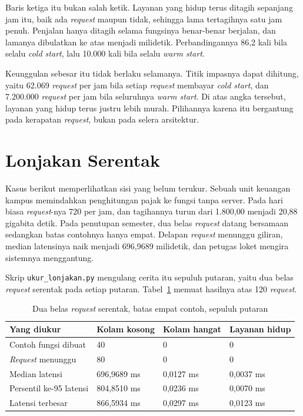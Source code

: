 Baris ketiga itu bukan salah ketik. Layanan yang hidup terus ditagih sepanjang
jam itu, baik ada \textit{request} maupun tidak, sehingga lama tertagihnya satu jam
penuh. Penjalan hanya ditagih selama fungsinya benar-benar berjalan, dan
lamanya dibulatkan ke atas menjadi milidetik. Perbandingannya 86,2 kali bila
selalu \textit{cold start}, lalu 10.000 kali bila selalu \textit{warm
start}.

Keunggulan sebesar itu tidak berlaku selamanya. Titik impasnya dapat dihitung,
yaitu 62.069 \textit{request} per jam bila setiap \textit{request} membayar
\textit{cold start}, dan 7.200.000 \textit{request} per jam bila seluruhnya
\textit{warm start}. Di atas angka
tersebut, layanan yang hidup terus justru lebih murah. Pilihannya karena itu
bergantung pada kerapatan \textit{request}, bukan pada selera arsitektur.

\section{Lonjakan Serentak}

Kasus berikut memperlihatkan sisi yang belum terukur. Sebuah unit keuangan
kampus memindahkan penghitungan pajak ke fungsi tanpa server. Pada hari biasa
\textit{request}-nya 720 per jam, dan tagihannya turun dari 1.800,00 menjadi 20,88
gigabita detik. Pada penutupan semester, dua belas \textit{request} datang bersamaan
sedangkan batas contohnya hanya empat. Delapan \textit{request} menunggu giliran,
median latensinya naik menjadi 696,9689 milidetik, dan petugas loket mengira
sistemnya menggantung.

Skrip \texttt{ukur\_lonjakan.py} mengulang cerita itu sepuluh putaran, yaitu
dua belas \textit{request} serentak pada setiap putaran.
Tabel~\ref{tab:lonjakan-serverless} memuat hasilnya atas 120 \textit{request}.

\begin{table}[htbp]
  \centering
  \caption{Dua belas \textit{request} serentak, batas empat contoh, sepuluh putaran}
  \label{tab:lonjakan-serverless}
  \begin{tabularx}{\textwidth}{|X|l|l|l|}
    \hline
    \textbf{Yang diukur} & \textbf{Kolam kosong} & \textbf{Kolam hangat} & \textbf{Layanan hidup} \\
    \hline
    Contoh fungsi dibuat & 40 & 0 & 0 \\
    \hline
    \textit{Request} menunggu & 80 & 0 & 0 \\
    \hline
    Median latensi & 696,9689 ms & 0,0127 ms & 0,0037 ms \\
    \hline
    Persentil ke-95 latensi & 804,8510 ms & 0,0236 ms & 0,0070 ms \\
    \hline
    Latensi terbesar & 866,5934 ms & 0,0297 ms & 0,0123 ms \\
    \hline
  \end{tabularx}
\end{table}

